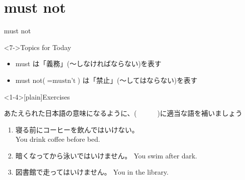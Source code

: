 \documentclass[aspectratio=169,xcolor={dvipsnames,table}]{beamer}
\newcommand{\myaudio}[1]{\href{#1}{\faVolumeUp}}
\begin{document}
\section{must not}
\begin{frame}[plain]{must not}
 
\Large


\vspace{-10pt}
\mbox{}\hfill{}



\hfill{}

\hfill{{\scriptsize \myaudio{./audio/013_must_04.mp3}}}

\vfill

\begin{exampleblock}<7->{Topics for Today}
\begin{itemize}[square]\small
 \item must は「義務」(〜しなければならない)を表す
 \item must not($=\text{mustn't}$) は「禁止」(〜してはならない)を表す
 \end{itemize}
     \end{exampleblock}

\end{frame}
\begin{frame}<1-4>[plain]{Exercises}
 
あたえられた日本語の意味になるように、(~~~~~~)に適当な語を補いましょう
\hfill{\myaudio{./audio/013_must_05.mp3}}


\begin{enumerate}
 \item 寝る前にコーヒーを飲んではいけない。\\
You  drink coffee before bed.
 \item 暗くなってから泳いではいけません。 You  swim after dark.
 \item 図書館で走ってはいけません。 You   in the library.
\end{enumerate}
\end{frame}
\end{document}
